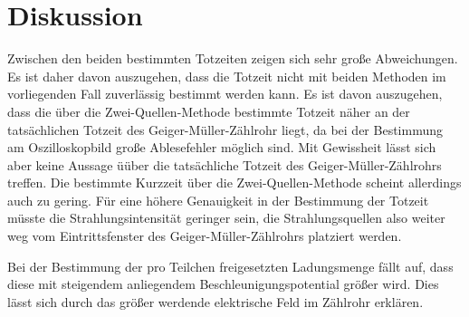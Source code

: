\section{Diskussion}
\label{sec:Diskussion}
Zwischen den beiden bestimmten Totzeiten zeigen sich sehr große Abweichungen.
Es ist daher davon auszugehen, dass die Totzeit nicht mit beiden Methoden im vorliegenden Fall zuverlässig bestimmt werden kann. Es ist davon auszugehen, dass die über die Zwei-Quellen-Methode bestimmte Totzeit näher an der tatsächlichen Totzeit des Geiger-Müller-Zählrohr liegt, da bei der Bestimmung am Oszilloskopbild große Ablesefehler möglich sind.
Mit Gewissheit lässt sich aber keine Aussage üüber die tatsächliche Totzeit des Geiger-Müller-Zählrohrs treffen.
Die bestimmte Kurzzeit über die Zwei-Quellen-Methode scheint allerdings auch zu gering.
Für eine höhere Genauigkeit in der Bestimmung der Totzeit müsste die Strahlungsintensität geringer sein, die Strahlungsquellen also weiter weg vom Eintrittsfenster des Geiger-Müller-Zählrohrs platziert werden.

Bei der Bestimmung der pro Teilchen freigesetzten Ladungsmenge fällt auf, dass diese mit steigendem anliegendem Beschleunigungspotential größer wird.
Dies lässt sich durch das größer werdende elektrische Feld im Zählrohr erklären.
